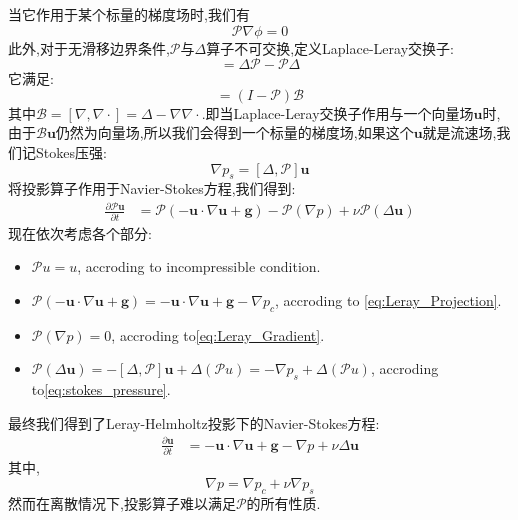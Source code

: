 \documentclass[12pt,halfline,a4paper]{ouparticle}
\begin{document}
当它作用于某个标量的梯度场时,我们有
\begin{equation}\label{eq:Leray_Gradient}
    \mathscr{P}\nabla \phi = 0
\end{equation}
此外,对于无滑移边界条件,$\mathscr{P}$与$\Delta$算子不可交换,定义Laplace-Leray交换子:
\begin{equation*}
[\Delta, \mathscr{P}] = \Delta \mathscr{P} - \mathscr{P}\Delta
\end{equation*}
它满足:
\begin{equation*}
[\Delta, \mathscr{P}] = (I -\mathscr{P})\mathcal{B}
\end{equation*}
其中$\mathcal{B} = [\nabla, \nabla\cdot] = \Delta - \nabla\nabla \cdot$.即当Laplace-Leray交换子作用与一个向量场$\boldsymbol{u}$时,由于$\mathcal{B}\boldsymbol{u}$仍然为向量场,所以我们会得到一个标量的梯度场,如果这个$\boldsymbol{u}$就是流速场,我们记Stokes压强:
\begin{equation}\label{eq:stokes_pressure}
    \nabla p_s = [\Delta, \mathscr{P}]\boldsymbol{u}
\end{equation}
将投影算子作用于Navier-Stokes方程,我们得到:
\begin{equation}
    \begin{aligned}
        \frac{\partial \mathscr{P}\boldsymbol{u} }{\partial t}&= \mathscr{P}(-\boldsymbol{u} \cdot \nabla \boldsymbol{u}  + \mathbf{g}) -\mathscr{P}(\nabla p) + \nu \mathscr{P}(\Delta \boldsymbol{u})
    \end{aligned}
\end{equation}
现在依次考虑各个部分:
\begin{itemize}
    \item $\mathscr{P}u = u$, accroding to incompressible condition.
    \item $\mathscr{P}(-\boldsymbol{u} \cdot \nabla \boldsymbol{u}  + \mathbf{g})  =  -\boldsymbol{u} \cdot \nabla \boldsymbol{u}  + \mathbf{g}  - \nabla p_c$, accroding to \eqref{eq:Leray_Projection}.
    \item $\mathscr{P}(\nabla p) = 0$, accroding to\eqref{eq:Leray_Gradient}.
    \item $\mathscr{P}(\Delta \boldsymbol{u}) = -[\Delta, \mathscr{P}]\boldsymbol{u} + \Delta(\mathscr{P}u) = -\nabla p_s + \Delta(\mathscr{P}u)$, accroding to\eqref{eq:stokes_pressure}.
\end{itemize}
最终我们得到了Leray-Helmholtz投影下的Navier-Stokes方程:
\begin{equation}\label{eq:projection_ns}
    \begin{aligned}
        \frac{\partial\boldsymbol{u} }{\partial t}&= -\boldsymbol{u} \cdot \nabla \boldsymbol{u}  + \mathbf{g}  - \nabla p + \nu \Delta\boldsymbol{u}
    \end{aligned}
\end{equation}
其中,
\begin{equation}\label{eq:total_pressure}
    \nabla p = \nabla p_c + \nu \nabla p_s
\end{equation}
然而在离散情况下,投影算子难以满足$\mathscr{P}$的所有性质.
\end{document}

